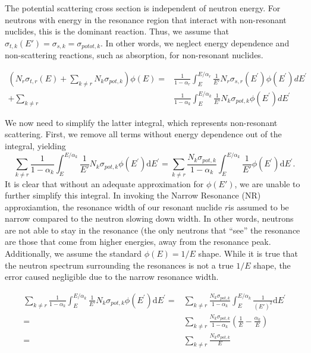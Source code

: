 \documentclass[10pt]{article}
\begin{document}
The potential scattering cross section is independent of neutron energy. For neutrons with energy in the resonance region that interact with non-resonant nuclides, this is the dominant reaction. Thus, we assume that $\sigma_{t,k}(E')=\sigma_{s,k}=\sigma_{potot,k}$. In other words, we neglect energy dependence and non-scattering reactions, such as absorption, for non-resonant nuclides. 

\begin{align} \left(N_{r}\sigma_{t,r}(E)+\sum\limits_{k\neq r}N_{k}\sigma_{pot,k}\right)\phi(E)=&\frac{1}{1-\alpha_{r}}\int_{E}^{E/\alpha_{r}}\frac{1}{E'}N_{r}\sigma_{s,r}\left(E^{\prime}\right)\phi\left(E^{\prime}\right)dE^{\prime}\\ + \sum\limits_{k\neq r}&\frac{1}{1-\alpha_{k}}\int_{E}^{E/\alpha_{k}}\frac{1}{E'}N_{k}\sigma_{pot,k}\phi\left(E^{\prime}\right)dE^{\prime}\end{align}
  
  
  
We now need to simplify the latter integral, which represents non-resonant scattering. First, we remove all terms without energy dependence out of the integral, yielding
\begin{equation}\sum\limits_{k\neq r}\frac{1}{1-\alpha_{k}}\int_{E}^{E/\alpha_{k}}\frac{1}{E'}N_{k}\sigma_{pot,k}\phi\left(E^{\prime}\right)\mathrm{d}E^{\prime}=\sum\limits_{k\neq r}\frac{N_{k}\sigma_{pot,k}}{1-\alpha_{k}}\int_{E}^{E/\alpha_{k}}\frac{1}{E'}\phi\left(E^{\prime}\right)\mathrm{d}E^{\prime}.\end{equation}
It is clear that without an adequate approximation for $\phi(E')$, we are unable to further simplify this integral. In invoking the Narrow Resonance (NR) approxiamtion, the resonance width of our resonant nuclide $r$is assumed to be narrow compared to the neutron slowing down width. In other words, neutrons are not able to stay in the resonance (the only neutrons that ``see'' the resonance are those that come from higher energies, away from the resonance peak. Additionally, we assume the standard $\phi(E)=1/E$ shape. While it is true that the neutron spectrum surrounding the resonances is not a true $1/E$ shape, the error caused negligible due to the narrow resonance width.


\begin{align}
  \sum\limits_{k\neq r}\frac{1}{1-\alpha_{k}}\int_{E}^{E/\alpha_{k}}\frac{1}{E'}N_{k}\sigma_{pot,k}\phi\left(E^{\prime}\right)\mathrm{d}E^{\prime} = &\sum\limits_{k\neq r}\frac{N_{k}\sigma_{pot,k}}{1-\alpha_{k}}\int_{E}^{E/\alpha_{k}}\frac{1}{(E')^2}\mathrm{d}E^{\prime}\\
  = &\sum\limits_{k\neq r}\frac{N_{k}\sigma_{pot,k}}{1-\alpha_{k}}\left(\frac{1}{E}-\frac{\alpha_k}{E}\right)\\
  = &\sum\limits_{k\neq r}\frac{N_{k}\sigma_{pot,k}}{E}
\end{align}
\end{document}
